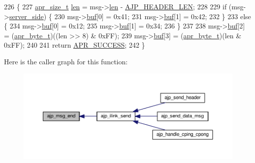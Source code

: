 \begin{DoxyCode}
226 \{
227     \hyperlink{group__apr__platform_gaaa72b2253f6f3032cefea5712a27540e}{apr\_size\_t} \hyperlink{group__APACHE__CORE__LOG_gab5a43233d60ef05c5b5bf5cba3d74468}{len} = msg->\hyperlink{structajp__msg_ab31fbddb808b5f3c0549cdb0f39639cf}{len} - \hyperlink{group__AJP__defines_ga46f6439c978873cb76944ae66a5c2e4d}{AJP\_HEADER\_LEN};
228 
229     \textcolor{keywordflow}{if} (msg->\hyperlink{structajp__msg_ac7e410963f1d5bded8e7df9fe5605484}{server\_side}) \{
230         msg->\hyperlink{structajp__msg_a7343b1803e9177dccb3c4716a5e12c3a}{buf}[0] = 0x41;
231         msg->\hyperlink{structajp__msg_a7343b1803e9177dccb3c4716a5e12c3a}{buf}[1] = 0x42;
232     \}
233     \textcolor{keywordflow}{else} \{
234         msg->\hyperlink{structajp__msg_a7343b1803e9177dccb3c4716a5e12c3a}{buf}[0] = 0x12;
235         msg->\hyperlink{structajp__msg_a7343b1803e9177dccb3c4716a5e12c3a}{buf}[1] = 0x34;
236     \}
237 
238     msg->\hyperlink{structajp__msg_a7343b1803e9177dccb3c4716a5e12c3a}{buf}[2] = (\hyperlink{group__apr__platform_gadcfa334915b4605a0052cb4ca542eb3a}{apr\_byte\_t})((len >> 8) & 0xFF);
239     msg->\hyperlink{structajp__msg_a7343b1803e9177dccb3c4716a5e12c3a}{buf}[3] = (\hyperlink{group__apr__platform_gadcfa334915b4605a0052cb4ca542eb3a}{apr\_byte\_t})(len & 0xFF);
240 
241     \textcolor{keywordflow}{return} \hyperlink{group__apr__errno_ga9ee311b7bf1c691dc521d721339ee2a6}{APR\_SUCCESS};
242 \}
\end{DoxyCode}


Here is the caller graph for this function\+:
\nopagebreak
\begin{figure}[H]
\begin{center}
\leavevmode
\includegraphics[width=350pt]{group__AJP__api_gad2b6d66e5dbf8369ab3d2e64adf81232_icgraph}
\end{center}
\end{figure}


